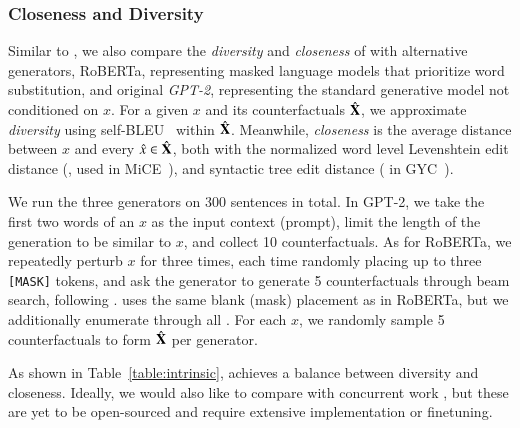 \subsubsection{Closeness and Diversity}
\label{appendix:closeness}
Similar to \citet{madaan2020generate}, we also compare the \emph{diversity} and \emph{closeness} of \sysname with alternative generators, \ie RoBERTa, representing masked language models that prioritize word substitution, and original \emph{GPT-2}, representing the standard generative model not conditioned on $x$. 
For a given $x$ and its counterfactuals $\hat{\mathbf{X}}$, we approximate \emph{diversity} using self-BLEU~\cite{zhu2018texygen} within $\hat{\mathbf{X}}$.
Meanwhile, \emph{closeness} is the average distance between $x$ and every $\hat{x} \in \hat{\mathbf{X}}$, both with the normalized word level Levenshtein edit distance (\cite{levenshtein1966binary}, used in MiCE~\cite{ross2020explaining}), and syntactic tree edit distance (\cite{zhang1989simple} in GYC~\cite{madaan2020generate}).

We run the three generators on 300 sentences in total.
In GPT-2, we take the first two words of an $x$ as the input context (prompt), limit the length of the generation to be similar to $x$, and collect 10 counterfactuals.
As for RoBERTa, we repeatedly perturb $x$ for three times, each time randomly placing up to three \texttt{[MASK]} tokens, and ask the generator to generate 5 counterfactuals through beam search, following \citet{checklist:acl20}.
\sysname uses the same blank (mask) placement as in RoBERTa, but we additionally enumerate through all \tagstrs.
For each $x$, we randomly sample 5 counterfactuals to form $\hat{\mathbf{X}}$ per generator.

As shown in Table~\ref{table:intrinsic}, \sysname achieves a balance between diversity and closeness.
Ideally, we would also like to compare \sysname with concurrent work \cite{madaan2020generate, ross2020explaining}, but these are yet to be open-sourced and require extensive implementation or finetuning.

